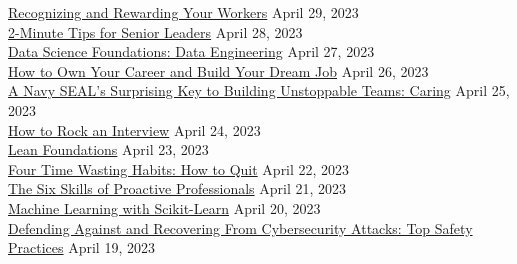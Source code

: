 \documentclass[10pt]{res} %
\begin{document}
\begin{resume}
\href{https://www.linkedin.com/learning/certificates/deeef89c252aa37cfd74e3ae665fbf048629c714d7ee53dfa1cc1882993b008f}{\color{blue}Recognizing and Rewarding Your Workers} \hfill April 29, 2023 \\
\href{https://www.linkedin.com/learning/certificates/42f41a60d59dfaa0e668cea3d252ccb3e95c69964760fcd8ab483373a5a2afc7}{\color{blue}2-Minute Tips for Senior Leaders} \hfill April 28, 2023 \\
\href{https://www.linkedin.com/learning/certificates/33d80e62db5367fefc6dbef2ae4cb4f3a4cdb6b9901a745774c6cc389a567130}{\color{blue}Data Science Foundations: Data Engineering} \hfill April 27, 2023 \\
\href{https://www.linkedin.com/learning/certificates/547285b6966407df4e213b74383cb3b4fec2eb692c5bfeddbd88b757cd5a6adc}{\color{blue}How to Own Your Career and Build Your Dream Job} \hfill April 26, 2023 \\
\href{https://www.linkedin.com/learning/certificates/3c325cb152e8a12c8b777e8acf801bf35967c2b5f095bcb6eff1eb9269454b49}{\color{blue}A Navy SEAL's Surprising Key to Building Unstoppable Teams: Caring} \hfill April 25, 2023 \\
\href{https://www.linkedin.com/learning/certificates/0c65ba5b38afe7be2a8786de7a1fd8117f7cd254a8bad68cd2c7616fc210c59a}{\color{blue}How to Rock an Interview} \hfill April 24, 2023 \\
\href{https://www.linkedin.com/learning/certificates/ca583b249c315d3c343292bb976e74b6391b2955c5a2abbc50c6b167972ad430}{\color{blue}Lean Foundations} \hfill April 23, 2023 \\
\href{https://www.linkedin.com/learning/certificates/2171b5fccc8314b15a60c49a3194ec990d20e16c1bf17d6c7c2a8a5b0a271a1f}{\color{blue}Four Time Wasting Habits: How to Quit} \hfill April 22, 2023 \\
\href{https://www.linkedin.com/learning/certificates/6b7b4d9d477e467394f88c6843c34c68a430d4f4fef230726aa5a002402d2115}{\color{blue}The Six Skills of Proactive Professionals} \hfill April 21, 2023 \\
\href{https://www.linkedin.com/learning/certificates/8d419f9649a161f627af38c45c543a40fb5f87f86154f67297e1749d6445cc1e}{\color{blue}Machine Learning with Scikit-Learn} \hfill April 20, 2023 \\
\href{https://www.linkedin.com/learning/certificates/1113a44d0a0f40403876f908b0c87bf1eb43dce151b82ef4d6d62ef1183f2c5d}{\color{blue}Defending Against and Recovering From Cybersecurity Attacks: Top Safety Practices} \hfill April 19, 2023 \\

\end{resume}
\end{document}
